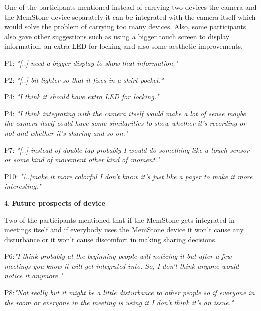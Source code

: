 \documentclass[mscthesis]{usiinfthesis}
\begin{document}
One of the participants mentioned instead of carrying two devices the camera and the MemStone device separately it can be integrated with the camera itself which would solve the problem of carrying too many devices. Also, some participants also gave other suggestions such as using a bigger touch screen to display information, an extra LED for locking and also some aesthetic improvements.
\newline
\hspace{\parindent}\begin{adjustwidth}{1cm}{1cm}
\hspace{\parindent}P1: \textit{"[..] need a bigger display to show that information."}

P2: \textit{"[..] bit lighter so that it fixes in a shirt pocket."}

P4: \textit{"I think it should have extra LED for locking."}

P4: \textit{"I think integrating with the camera itself would make a lot of sense maybe the camera itself could have some similarities to show whether it's recording or not and whether it's sharing and so on."}

P7: \textit{"[..] instead of double tap probably I would do something like a touch sensor or some kind of movement other kind of moment."}

P10: \textit{"[..]make it more colorful I don't know it's just like a pager to make it more interesting."}
\newline
\end{adjustwidth}

4. \textbf{Future prospects of device}

Two of the participants mentioned that if the MemStone gets integrated in meetings itself and if everybody uses the MemStone device it won't cause any disturbance or it won't cause discomfort in making sharing decisions.  
\newline
\hspace{\parindent}\begin{adjustwidth}{1cm}{1cm}
\hspace{\parindent}P6:\textit{"I think probably at the beginning people will noticing it but after a few meetings you know it will get integrated into. So, I don't think anyone would notice it anymore."}

P8:\textit{"Not really but it might be a little disturbance to other people so if everyone in the room or everyone in the meeting is using it I don't think it's an issue."}
\newline
\end{adjustwidth}
\end{document}

